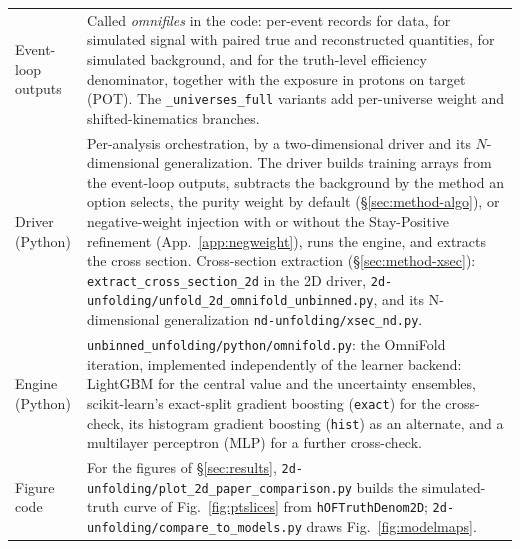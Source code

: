 \begin{table}[H]
\begin{tabular}{@{}>{\raggedright\arraybackslash}p{}>{\raggedright\arraybackslash}p{}@{}}
Event-loop outputs & Called \emph{omnifiles} in the code: per-event records for data, for simulated signal with paired true and reconstructed quantities, for simulated background, and for the truth-level efficiency denominator, together with the exposure in protons on target (POT). The \texttt{\_universes\_full} variants add per-universe weight and shifted-kinematics branches. \\
Driver (Python) & Per-analysis orchestration, by a two-dimensional driver and its $N$-dimensional generalization. The driver builds training arrays from the event-loop outputs, subtracts the background by the method an option selects, the purity weight by default (\S\ref{sec:method-algo}), or negative-weight injection with or without the Stay-Positive refinement (App.~\ref{app:negweight}), runs the engine, and extracts the cross section. Cross-section extraction (\S\ref{sec:method-xsec}): \texttt{extract\_cross\_section\_2d} in the 2D driver, \texttt{2d-unfolding/unfold\_2d\_omnifold\_unbinned.py}, and its N-dimensional generalization \texttt{nd-unfolding/xsec\_nd.py}. \\
Engine (Python) & \texttt{unbinned\_unfolding/python/omnifold.py}: the OmniFold iteration, implemented independently of the learner backend: LightGBM for the central value and the uncertainty ensembles, scikit-learn's exact-split gradient boosting (\texttt{exact}) for the cross-check, its histogram gradient boosting (\texttt{hist}) as an alternate, and a multilayer perceptron (MLP) for a further cross-check. \\
Figure code & For the figures of \S\ref{sec:results}, \texttt{2d-unfolding/plot\_2d\_paper\_comparison.py} builds the simulated-truth curve of Fig.~\ref{fig:ptslices} from \texttt{hOFTruthDenom2D}; \texttt{2d-unfolding/compare\_to\_models.py} draws Fig.~\ref{fig:modelmaps}. \\
\bottomrule
\end{tabular}
\end{table}


